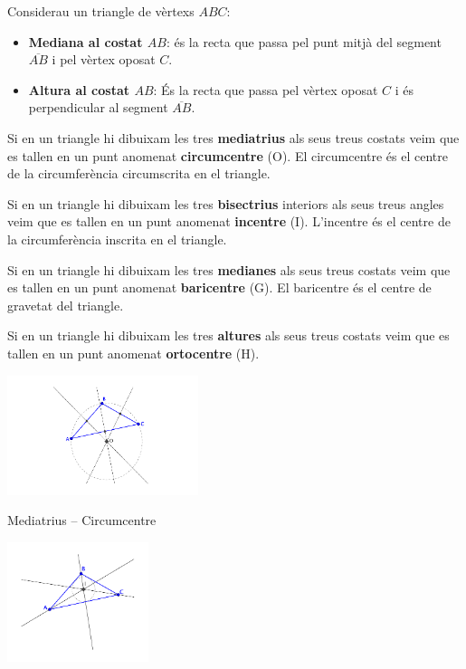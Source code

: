 \pagebreak

\begin{theorybox}
	Considerau un triangle de vèrtexs $ABC$:
	\begin{itemize}	
		\item \textbf{Mediana al costat $AB$}: és la recta que passa pel punt mitjà del segment $\overline{AB}$ i pel vèrtex oposat $C$.
		
		\item \textbf{Altura al costat $AB$}: És la recta que passa pel vèrtex oposat $C$ i és perpendicular al segment $\overline{AB}$.
	\end{itemize}
	
	Si en un triangle hi dibuixam les tres \textbf{mediatrius} als seus treus costats veim que es tallen en un punt anomenat \textbf{circumcentre} (O). El circumcentre és el centre de la circumferència circumscrita en el triangle.
	
	Si en un triangle hi dibuixam les tres \textbf{bisectrius} interiors als seus treus angles veim que es tallen en un punt anomenat \textbf{incentre} (I). L'incentre és el centre de la circumferència inscrita en el triangle.
	
	Si en un triangle hi dibuixam les tres \textbf{medianes} als seus treus costats veim que es tallen en un punt anomenat \textbf{baricentre} (G). El baricentre és el centre de gravetat del triangle.
	
	Si en un triangle hi dibuixam les tres \textbf{altures} als seus treus costats veim que es tallen en un punt anomenat \textbf{ortocentre} (H). 
	
	\begin{multicols}{2}
		\footnotesize
		\centering
		
		\includegraphics[height=3.5cm]{img-09/circumcentre}
		
		Mediatrius -- Circumcentre
		
		\includegraphics[height=3.5cm]{img-09/incentre}
		

\end{multicols}
\end{theorybox}
